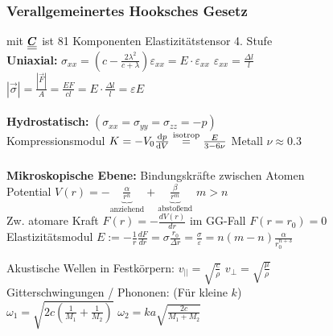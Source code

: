 \documentclass[fs, footer]{latex4ei}
\begin{document}
\begin{multicols*}{4}
{\subsubsection*{Verallgemeinertes Hooksches Gesetz}
 mit $\underline{\underline{\boldsymbol C}}$ ist 81 Komponenten Elastizitätstensor 4. Stufe\\
\textbf{Uniaxial:} $\sigma_{xx} = \left( c - \frac{2 \lambda^2}{c + \lambda} \right) \varepsilon_{xx} = E \cdot \varepsilon_{xx}$ \quad $\varepsilon_{xx} = \frac{\Delta l}{l}$\\
$|\vec \sigma| = \frac{|\vec F|}{A} = \frac{EF}{cl} = E \cdot \frac{\Delta l}{l} = \varepsilon E$\\
\\
\textbf{Hydrostatisch:} $(\sigma_{xx} = \sigma_{yy} = \sigma_{zz} = -p)$\\
Kompressionsmodul $K = - V_0 \frac{\diff p}{\diff V} \overset{\text{isotrop}}{=} \frac{E}{3-6\nu}$ \quad Metall $\nu \approx 0.3$\\ 
\\
\textbf{Mikroskopische Ebene:} Bindungskräfte zwischen Atomen\\
Potential $V(r) = - \underbrace{\frac{\alpha}{r^n}}_{\text{anziehend}} + \underbrace{\frac{\beta}{r^m}}_{\text{abstoßend}}$ \qquad $m > n$\\ 
Zw. atomare Kraft $F(r) = - \frac{d V(r)}{dr}$ im GG-Fall $F(r = r_0) = 0$ \\[0.5em]
Elastizitätsmodul $E := - \frac 1 r \frac{dF}{dr} = \sigma \frac{r_0}{\Delta r} = \frac{\sigma}{\varepsilon} = n(m-n) \frac{\alpha}{r_0^{n+3}}$




Akustische Wellen in Festkörpern: $v_{||} = \sqrt{\frac{c}{\rho}}$ \qquad $v_{\perp} = \sqrt{\frac{\mu}{\rho}}$\\
Gitterschwingungen / Phononen: (Für kleine $k$)\\
$\omega_1 = \sqrt{2 c (\frac{1}{M_1} + \frac{1}{M_2})}$ \qquad $\omega_2 = ka\sqrt{ \frac{2 c}{M_1 + M_2}}$
}



\end{multicols*}
\end{document}
